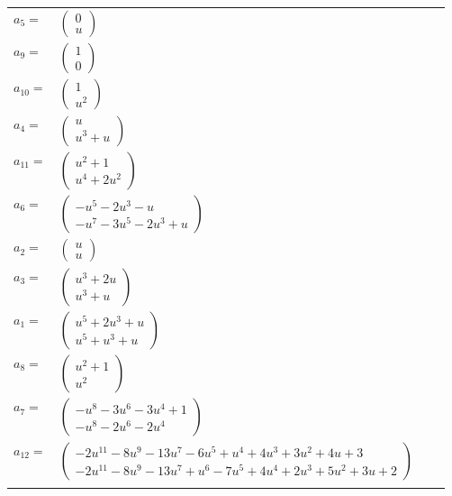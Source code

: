 \documentclass[1p]{elsarticle_modified}
\theoremstyle{definition}
\begin{document}
\begin{tabular}{m{7pt} m{180pt} m{7pt} m{180pt} }
\flushright $a_{5}=$&$\begin{pmatrix}0\\u\end{pmatrix}$ \\
\flushright $a_{9}=$&$\begin{pmatrix}1\\0\end{pmatrix}$ \\
\flushright $a_{10}=$&$\begin{pmatrix}1\\u^2\end{pmatrix}$ \\
\flushright $a_{4}=$&$\begin{pmatrix}u\\u^3+u\end{pmatrix}$ \\
\flushright $a_{11}=$&$\begin{pmatrix}u^2+1\\u^4+2 u^2\end{pmatrix}$ \\
\flushright $a_{6}=$&$\begin{pmatrix}- u^5-2 u^3- u\\- u^7-3 u^5-2 u^3+u\end{pmatrix}$ \\
\flushright $a_{2}=$&$\begin{pmatrix}u\\u\end{pmatrix}$ \\
\flushright $a_{3}=$&$\begin{pmatrix}u^3+2 u\\u^3+u\end{pmatrix}$ \\
\flushright $a_{1}=$&$\begin{pmatrix}u^5+2 u^3+u\\u^5+u^3+u\end{pmatrix}$ \\
\flushright $a_{8}=$&$\begin{pmatrix}u^2+1\\u^2\end{pmatrix}$ \\
\flushright $a_{7}=$&$\begin{pmatrix}- u^8-3 u^6-3 u^4+1\\- u^8-2 u^6-2 u^4\end{pmatrix}$ \\
\flushright $a_{12}=$&$\begin{pmatrix}-2 u^{11}-8 u^9-13 u^7-6 u^5+u^4+4 u^3+3 u^2+4 u+3\\-2 u^{11}-8 u^9-13 u^7+u^6-7 u^5+4 u^4+2 u^3+5 u^2+3 u+2\end{pmatrix}$\\&\end{tabular}
\end{document}
